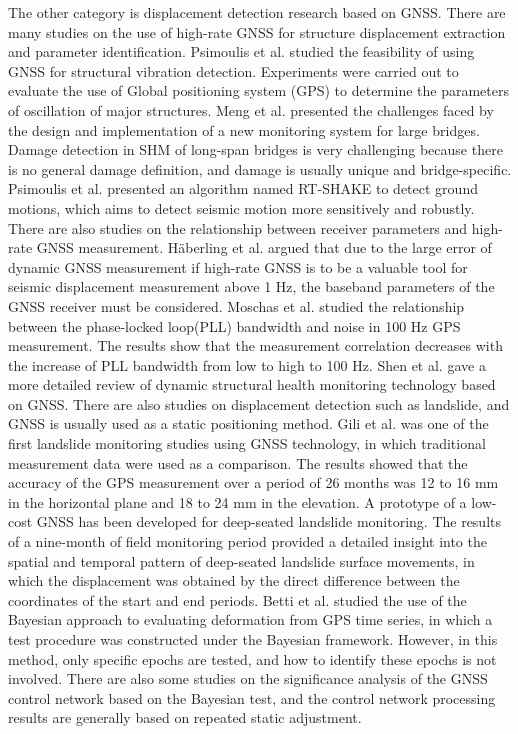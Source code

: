 \documentclass[final,3p,times]{elsarticle}
\begin{document}
	\textcolor{r_s}{
	The other category is displacement detection research based on GNSS.
	There are many studies on the use of high-rate GNSS for structure displacement extraction and parameter identification.
	Psimoulis et al.\cite{psimoulis2008_1,psimoulis2008_2} studied the feasibility of using GNSS for structural vibration detection. Experiments were carried out to evaluate the use of Global positioning system (GPS) to determine the parameters of oscillation of major structures.
	Meng et al.\cite{Meng_2018} presented the challenges faced by the design and implementation of a new monitoring system for large bridges. Damage detection in SHM of long-span bridges is very challenging because there is no general damage definition, and damage is usually unique and bridge-specific. Psimoulis et al.\cite{psimoulis2018detection} presented an algorithm named RT-SHAKE to detect ground motions, which aims to detect seismic motion more sensitively and robustly.	There are also studies on the relationship between receiver parameters and high-rate GNSS measurement\cite{Hberling2015,Moschas2015}.
	H{\"a}berling et al.\cite{Hberling2015} argued that due to the large error of dynamic GNSS measurement if high-rate GNSS is to be a valuable tool for seismic displacement measurement above 1 Hz, the baseband parameters of the GNSS receiver must be considered.
	Moschas et al.\cite{Moschas2015} studied the relationship between the phase-locked loop(PLL) bandwidth and noise in 100 Hz GPS measurement.
	The results show that the measurement correlation decreases with the increase of PLL bandwidth from low to high to 100 Hz. Shen et al.\cite{shennan_2019} gave a more detailed review of dynamic structural health monitoring technology based on GNSS. There are also studies on displacement detection such as landslide, and GNSS is usually used as a static positioning method.}
	Gili et al.\cite{gili2000using} was one of the first landslide monitoring studies using GNSS technology, in which traditional measurement data were used as a comparison. 
	The results showed that the accuracy of the GPS measurement over a period of 26 months was 12 to 16 mm in the horizontal plane and 18 to 24 mm in the elevation.
	A prototype of a low-cost GNSS has been developed for deep-seated landslide monitoring\cite{rs12203375}. 
	The results of a nine-month of field monitoring period provided a detailed insight into the spatial and temporal pattern of deep-seated landslide surface movements, in which the displacement was obtained by the direct difference between the coordinates of the start and end periods.
	\textcolor{r_s}{
		Betti et al.\cite{betti2001deformation,betti2011deformation} studied the use of the Bayesian approach to evaluating deformation from GPS time series, in which a test procedure was constructed under the Bayesian framework. However, in this method, only specific epochs are tested, and how to identify these epochs is not involved.
		There are also some studies on the significance analysis of the GNSS control network based on the Bayesian test, and the control network processing results are generally based on repeated static adjustment.
	}
	
\end{document}
